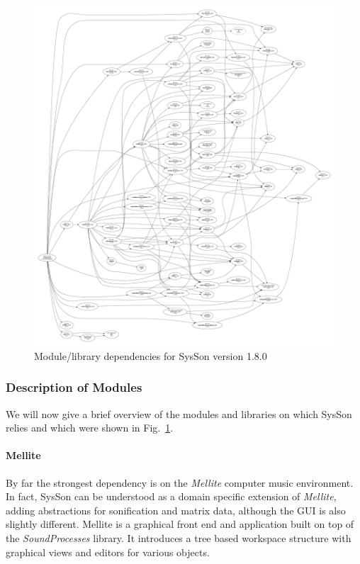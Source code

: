 \documentclass[11pt,a4paper]{article}
\newcommand{\figref}[1]{Fig.~\ref{#1}}
\newcommand{\software}[1]{\textit{#1}}
\newcommand{\sysson}[0]{SysSon}
\newcommand{\syssonVersion}[0]{1.8.0}
\begin{document}
\begin{figure}%
\includegraphics[width=\textwidth,trim=15mm 15mm 15mm 15mm]{figures/dependencies-compile.pdf}%
\caption{Module/library dependencies for SysSon version \syssonVersion{}}%
\label{fig:dependencies}%
\end{figure}

\subsubsection{Description of Modules}

We will now give a brief overview of the modules and libraries on which \sysson{} relies and which were shown in \figref{fig:dependencies}.

\paragraph{Mellite}

By far the strongest dependency is on the \software{Mellite} computer music environment. In fact, \sysson{} can be understood as a domain specific extension of \software{Mellite}, adding abstractions for sonification and matrix data, although the GUI is also slightly different.
%
Mellite is a graphical front end and application built on top of the \software{SoundProcesses} library. It introduces a tree based workspace structure with graphical views and editors for various objects.
\end{document}
